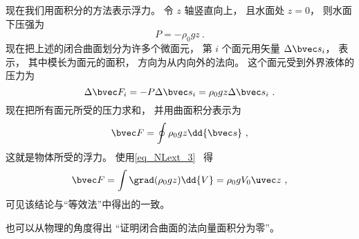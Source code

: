 


现在我们用面积分的方法表示浮力。 令 $z$ 轴竖直向上， 且水面处 $z = 0$， 则水面下压强为
\begin{equation}
P = -\rho_0 g z~.
\end{equation}
现在把上述的闭合曲面划分为许多个微面元， 第 $i$ 个面元用矢量 $\Delta \bvec s_i$， 表示， 其中模长为面元的面积， 方向为从内向外的法向。 这个面元受到外界液体的压力为
\begin{equation}
\Delta \bvec F_i = -P\Delta \bvec s_i = \rho_0 g z \Delta \bvec s_i~.
\end{equation}
现在把所有面元所受的压力求和， 并用曲面积分表示为
\begin{equation}
\bvec F = \oint \rho_0 g z \dd{\bvec s}~,
\end{equation}
这就是物体所受的浮力。 使用\autoref{eq_NLext_3}~ 得
\begin{equation}
\bvec F = \int \grad(\rho_0 g z) \dd{V} = \rho_0 g V_0 \uvec z~,
\end{equation}
可见该结论与“等效法”中得出的一致。

也可以从物理的角度得出 “证明闭合曲面的法向量面积分为零”。
